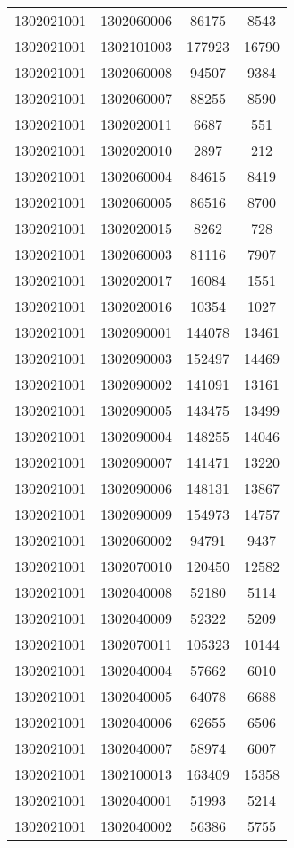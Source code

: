 \begin{longtable}[h]{llcc}
		1302021001 & 1302060006 & 86175 & 8543\\
		1302021001 & 1302101003 & 177923 & 16790\\
		1302021001 & 1302060008 & 94507 & 9384\\
		1302021001 & 1302060007 & 88255 & 8590\\
		1302021001 & 1302020011 & 6687 & 551\\
		1302021001 & 1302020010 & 2897 & 212\\
		1302021001 & 1302060004 & 84615 & 8419\\
		1302021001 & 1302060005 & 86516 & 8700\\
		1302021001 & 1302020015 & 8262 & 728\\
		1302021001 & 1302060003 & 81116 & 7907\\
		1302021001 & 1302020017 & 16084 & 1551\\
		1302021001 & 1302020016 & 10354 & 1027\\
		1302021001 & 1302090001 & 144078 & 13461\\
		1302021001 & 1302090003 & 152497 & 14469\\
		1302021001 & 1302090002 & 141091 & 13161\\
		1302021001 & 1302090005 & 143475 & 13499\\
		1302021001 & 1302090004 & 148255 & 14046\\
		1302021001 & 1302090007 & 141471 & 13220\\
		1302021001 & 1302090006 & 148131 & 13867\\
		1302021001 & 1302090009 & 154973 & 14757\\
		1302021001 & 1302060002 & 94791 & 9437\\
		1302021001 & 1302070010 & 120450 & 12582\\
		1302021001 & 1302040008 & 52180 & 5114\\
		1302021001 & 1302040009 & 52322 & 5209\\
		1302021001 & 1302070011 & 105323 & 10144\\
		1302021001 & 1302040004 & 57662 & 6010\\
		1302021001 & 1302040005 & 64078 & 6688\\
		1302021001 & 1302040006 & 62655 & 6506\\
		1302021001 & 1302040007 & 58974 & 6007\\
		1302021001 & 1302100013 & 163409 & 15358\\
		1302021001 & 1302040001 & 51993 & 5214\\
		1302021001 & 1302040002 & 56386 & 5755\\

\end{longtable}
